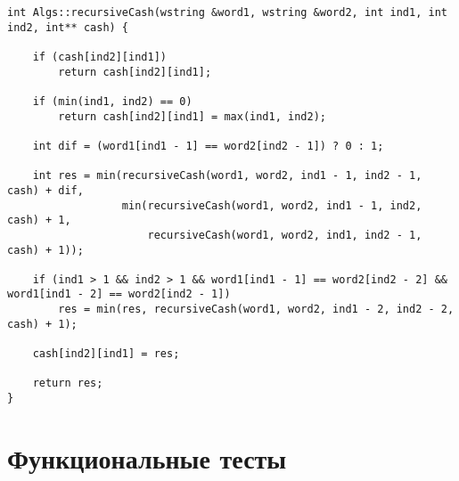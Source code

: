 \clearpage

\begin{lstlisting}[label=lst:dameray_lev_rec_hash,caption=Функция нахождения расстояния Дамерау~---~Левенштейна рекурсивно c кешированием]
int Algs::recursiveCash(wstring &word1, wstring &word2, int ind1, int ind2, int** cash) {

    if (cash[ind2][ind1])
        return cash[ind2][ind1];

    if (min(ind1, ind2) == 0)
        return cash[ind2][ind1] = max(ind1, ind2);

    int dif = (word1[ind1 - 1] == word2[ind2 - 1]) ? 0 : 1;

    int res = min(recursiveCash(word1, word2, ind1 - 1, ind2 - 1, cash) + dif,
                  min(recursiveCash(word1, word2, ind1 - 1, ind2, cash) + 1, 
                      recursiveCash(word1, word2, ind1, ind2 - 1, cash) + 1));

    if (ind1 > 1 && ind2 > 1 && word1[ind1 - 1] == word2[ind2 - 2] && word1[ind1 - 2] == word2[ind2 - 1])
        res = min(res, recursiveCash(word1, word2, ind1 - 2, ind2 - 2, cash) + 1);

    cash[ind2][ind1] = res;

    return res;
}
\end{lstlisting}

\clearpage

\section{Функциональные тесты}

